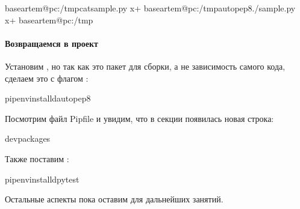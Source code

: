 \documentclass[letterpaper,10pt,russian]{sphinxmanual}
\begin{document}
\begin{sphinxVerbatim}[commandchars=\\\{\}]
baseartem@pc:\PYGZti{}/tmp\PYGZdl{}catsample.py
x+
baseartem@pc:\PYGZti{}/tmp\PYGZdl{}autopep8./sample.py
x+
baseartem@pc:\PYGZti{}/tmp\PYGZdl{}
\end{sphinxVerbatim}


\paragraph{Возвращаемся в проект}
\label{\detokenize{educational_materials/packaging/content:id4}}
\sphinxAtStartPar
Установим , но так как это пакет для сборки, а не зависимость самого кода, сделаем это с флагом :

\begin{sphinxVerbatim}[commandchars=\\\{\}]
pipenvinstall\PYGZhy{}dautopep8
\end{sphinxVerbatim}

\sphinxAtStartPar
Посмотрим файл Pipfile и увидим, что в секции  появилась новая строка:

\begin{sphinxVerbatim}[commandchars=\\\{\}]
\PYG{o}{[}dev\PYGZhy{}packages\PYG{o}{]}
\end{sphinxVerbatim}

\sphinxAtStartPar
Также поставим :

\begin{sphinxVerbatim}[commandchars=\\\{\}]
pipenvinstall\PYGZhy{}dpytest
\end{sphinxVerbatim}

\sphinxAtStartPar
Остальные аспекты пока оставим для дальнейших занятий.
\end{document}
